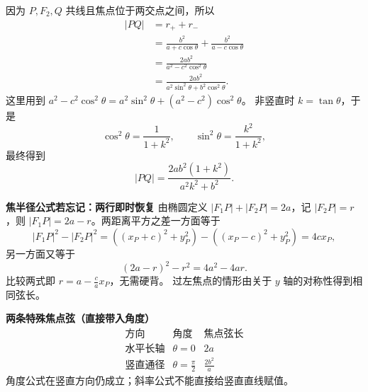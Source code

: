 \begin{proofbox}
\begin{description}[style=nextline,leftmargin=2.8em,labelsep=0.5em,itemsep=0.55em]
        \item[\textbf{第三步（相加、化为角度或斜率式）：}]
              因为 $P,F_2,Q$ 共线且焦点位于两交点之间，所以
              \[
                  \begin{aligned}
                  |PQ| &= r_++r_-\\
                       &=\frac{b^2}{a+c\cos\theta}
                         +\frac{b^2}{a-c\cos\theta}\\
                       &=\frac{2ab^2}{a^2-c^2\cos^2\theta}\\
                       &=\boxed{\frac{2ab^2}{a^2\sin^2\theta+b^2\cos^2\theta}}.
                  \end{aligned}
              \]
              这里用到 $a^2-c^2\cos^2\theta
              =a^2\sin^2\theta+(a^2-c^2)\cos^2\theta$。
              非竖直时 $k=\tan\theta$，于是
              \[
                  \cos^2\theta=\frac{1}{1+k^2},\qquad
                  \sin^2\theta=\frac{k^2}{1+k^2},
              \]
              最终得到
              \[
                  \boxed{|PQ|=\frac{2ab^2(1+k^2)}{a^2k^2+b^2}}.
              \]
    \end{description}

    \medskip

    \textbf{\textcolor{CProof}{焦半径公式若忘记：两行即时恢复}}
    由椭圆定义 $|F_1P|+|F_2P|=2a$，记 $|F_2P|=r$，则
    $|F_1P|=2a-r$。两距离平方之差一方面等于
    \[
        |F_1P|^2-|F_2P|^2
        =((x_P+c)^2+y_P^2)-((x_P-c)^2+y_P^2)=4cx_P,
    \]
    另一方面又等于
    \[
        (2a-r)^2-r^2=4a^2-4ar.
    \]
    比较两式即 $\boxed{r=a-\frac ca x_P}$，无需硬背。
    过左焦点的情形由关于 $y$ 轴的对称性得到相同弦长。

    \medskip

    \textbf{\textcolor{CProof}{两条特殊焦点弦（直接带入角度）}}
    \[
        \begin{array}{c|c|c}
        \text{方向}&\text{角度}&\text{焦点弦长}\\ \hline
        \text{水平长轴}&\theta=0&\boxed{2a}\\[0.35em]
        \text{竖直通径}&\theta=\frac{\pi}{2}&\boxed{\frac{2b^2}{a}}
        \end{array}
    \]
    角度公式在竖直方向仍成立；斜率公式不能直接给竖直直线赋值。
\end{proofbox}

